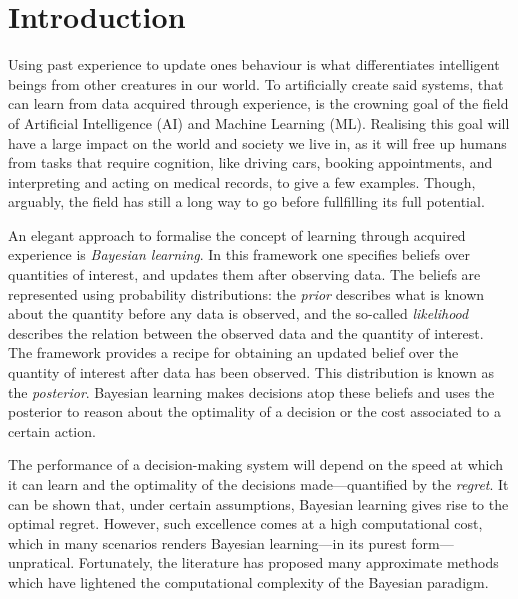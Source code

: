 \chapter{Introduction}  %

Using past experience to update ones behaviour is what differentiates intelligent beings from other creatures in our world. To artificially create said systems, that can learn from data acquired through experience, is the crowning goal of the field of Artificial Intelligence (AI) and Machine Learning (ML).
Realising this goal will have a large impact on the world and society we live in, as it will free up humans from tasks that require cognition, like driving cars, booking appointments, and interpreting and acting on medical records, to give a few examples. Though, arguably, the field has still a long way to go before fullfilling its full potential.

An elegant approach to formalise the concept of learning through acquired experience is \emph{Bayesian learning}. In this framework one specifies beliefs over quantities of interest, and updates them after observing data. The beliefs are represented using probability distributions: the \emph{prior} describes what is known about the quantity before any data is observed, and the so-called \emph{likelihood} describes the relation between the observed data and the quantity of interest. The framework provides a recipe for obtaining an updated belief over the quantity of interest after data has been observed. This distribution is known as the \emph{posterior}. Bayesian learning makes decisions atop these beliefs and uses the posterior to reason about the optimality of a decision or the cost associated to a certain action.

The performance of a decision-making system will depend on the speed at which it can learn and the optimality of the decisions made---quantified by the \emph{regret}. It can be shown that, under certain assumptions, Bayesian learning gives rise to the optimal regret. However, such excellence comes at a high computational cost, which in many scenarios renders Bayesian learning---in its purest form---unpratical. Fortunately, the literature has proposed many approximate methods which have lightened the computational complexity of the Bayesian paradigm.

